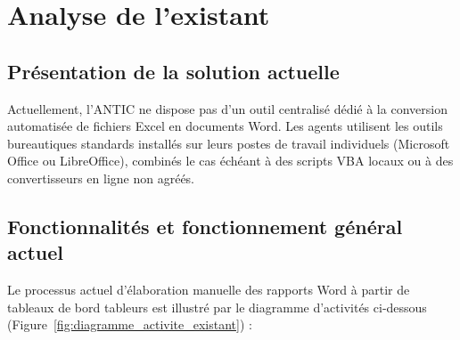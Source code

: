 \chapter{Analyse de l'existant}

\section{Présentation de la solution actuelle}

Actuellement, l'ANTIC ne dispose pas d'un outil centralisé dédié à la conversion automatisée de fichiers Excel en documents Word. Les agents utilisent les outils bureautiques standards installés sur leurs postes de travail individuels (Microsoft Office ou LibreOffice), combinés le cas échéant à des scripts VBA locaux ou à des convertisseurs en ligne non agréés.

\section{Fonctionnalités et fonctionnement général actuel}

Le processus actuel d'élaboration manuelle des rapports Word à partir de tableaux de bord tableurs est illustré par le diagramme d'activités ci-dessous (Figure~\ref{fig:diagramme_activite_existant}) :

